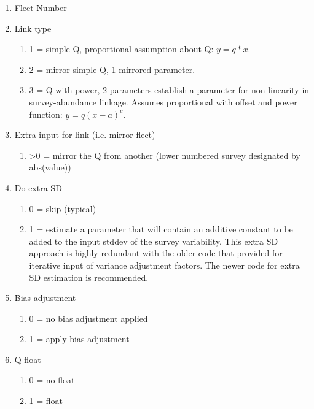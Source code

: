 \begin{enumerate}
	\item Fleet Number
	\item Link type
	\begin{enumerate}
		\item 1 = simple Q, proportional assumption about Q: $y=q*x$.
		\item 2 = mirror simple Q, 1 mirrored parameter.  %
		\item 3 = Q with power, 2 parameters establish a parameter for non-linearity in survey-abundance linkage.  Assumes proportional with offset and power function: $y=q(x-a)^c$.
	\end{enumerate}
	\item Extra input for link (i.e. mirror fleet)
	\begin{enumerate}
		\item >0 = mirror the Q from another (lower numbered survey designated by abs(value))
	\end{enumerate}
	\item Do extra SD
	\begin{enumerate}
		\item 0 = skip (typical)
		\item 1 = estimate a parameter that will contain an additive constant to be added to the input stddev of the survey variability.  This extra SD approach is highly redundant with the older code that provided for iterative input of variance adjustment factors.  The newer code for extra SD estimation is recommended.
	\end{enumerate}
	\item Bias adjustment
	\begin{enumerate}
		\item 0 = no bias adjustment applied
		\item 1 = apply bias adjustment
	\end{enumerate}
	\item Q float
	\begin{enumerate}
		\item 0 = no float 
		\item 1 = float
	\end{enumerate}
	

\end{enumerate}
